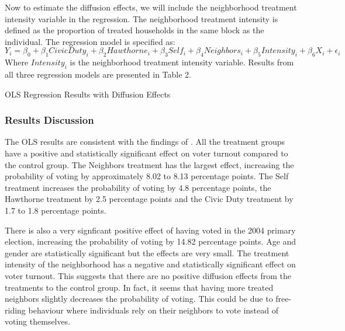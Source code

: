 \documentclass[11pt]{article}
\begin{document}
Now to estimate the diffusion effects, we will include the neighborhood treatment intensity variable in the regression. The neighborhood treatment intensity is defined as the proportion of treated households in the same block as the individual. The regression model is specified as:
\begin{equation}
    Y_i = \beta_0 + \beta_1 CivicDuty_i + \beta_2 Hawthorne_i + \beta_3 Self_i + \beta_4 Neighbors_i + \beta_5 Intensity_i + \beta_6 X_i + \epsilon_i
\end{equation}
Where $Intensity_i$ is the neighborhood treatment intensity variable. Results from all three regression models are presented in Table 2.

\begin{table}[H]
    \centering
    \caption{OLS Regression Results with Diffusion Effects}
    \vspace{-0.3cm}
    
    \label{tab:ols_diffusion}
\end{table}

\vspace{-0.5cm}
\subsubsection{Results Discussion}
The OLS results are consistent with the findings of \cite{gerber_social_2008}. All the treatment groups have a positive and statistically significant effect on voter turnout compared to the control group. The Neighbors treatment has the largest effect, increasing the probability of voting by approximately 8.02 to 8.13 percentage points. The Self treatment increases the probability of voting by 4.8 percentage points, the Hawthorne treatment by 2.5 percentage points and the Civic Duty treatment by 1.7 to 1.8 percentage points. 

There is also a very signficant positive effect of having voted in the 2004 primary election, increasing the probability of voting by 14.82 percentage points. Age and gender are statistically significant but the effects are very small. The treatment intensity of the neighborhood has a negative and statistically significant effect on voter turnout. This suggests that there are no positive diffusion effects from the treatments to the control group. In fact, it seems that having more treated neighbors slightly decreases the probability of voting. This could be due to free-riding behaviour where individuals rely on their neighbors to vote instead of voting themselves.
\end{document}
